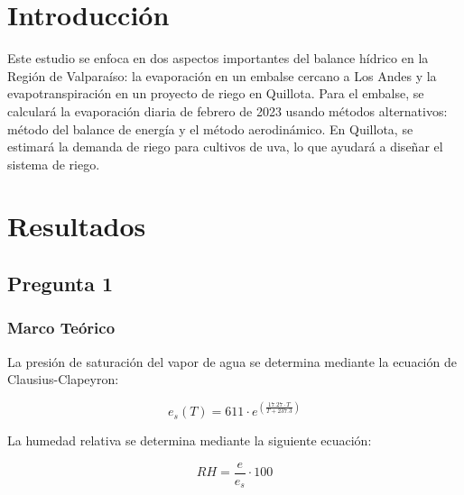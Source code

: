 \documentclass{article}  %
\begin{document}
\newpage
\thispagestyle{empty} %
\tableofcontents
\thispagestyle{plain} %
\thispagestyle{empty} %
\newpage

\setcounter{page}{1}
\section{Introducción}

Este estudio se enfoca en dos aspectos importantes del balance hídrico en la Región de Valparaíso: la evaporación en un embalse cercano a Los Andes y la evapotranspiración en un proyecto de riego en Quillota. Para el embalse, se calculará la evaporación diaria de febrero de 2023 usando métodos alternativos: método del balance de energía y el método aerodinámico. En Quillota, se estimará la demanda de riego para cultivos de uva, lo que ayudará a diseñar el sistema de riego. 
\newpage
\section{Resultados}

\subsection{Pregunta 1}

\subsubsection{Marco Teórico}

La presión de saturación del vapor de agua se determina mediante la ecuación de Clausius-Clapeyron:
  
\begin{equation}
  e_s(T) = 611 \cdot e^{\left(\frac{17.27 \cdot T}{T + 237.3}\right)}
\end{equation}

La humedad relativa se determina mediante la siguiente ecuación:

\begin{equation}
  RH = \frac{e}{e_s} \cdot 100
\end{equation}
\end{document}
